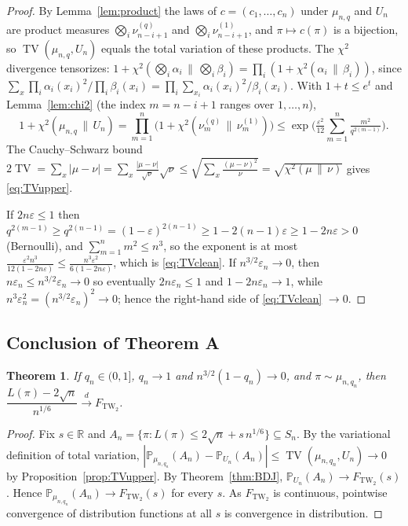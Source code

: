 \documentclass[12pt]{article}
\newtheorem{theorem}{Theorem}
\theoremstyle{definition}
\DeclareMathOperator{\TV}{TV}
\newcommand{\TW}{\mathrm{TW}_2}
\newcommand{\PP}{\mathbb{P}}
\newcommand{\R}{\mathbb{R}}
\newcommand{\eps}{\varepsilon}
\begin{document}
\begin{proof}
By Lemma~\ref{lem:product} the laws of $c=(c_1,\dots,c_n)$ under $\mu_{n,q}$ and $U_n$
are product measures $\bigotimes_i\nu^{(q)}_{n-i+1}$ and $\bigotimes_i\nu^{(1)}_{n-i+1}$,
and $\pi\mapsto c(\pi)$ is a bijection, so $\TV(\mu_{n,q},U_n)$ equals the total
variation of these products. The $\chi^2$ divergence tensorizes:
$1+\chi^2(\bigotimes_i\alpha_i\,\|\,\bigotimes_i\beta_i)=\prod_i(1+\chi^2(\alpha_i\,\|\,\beta_i))$,
since $\sum_x\prod_i\alpha_i(x_i)^2/\prod_i\beta_i(x_i)=\prod_i\sum_{x_i}\alpha_i(x_i)^2/\beta_i(x_i)$.
With $1+t\le e^t$ and Lemma~\ref{lem:chi2} (the index $m=n-i+1$ ranges over
$1,\dots,n$),
\[
1+\chi^2(\mu_{n,q}\,\|\,U_n)=\prod_{m=1}^n\big(1+\chi^2(\nu^{(q)}_m\,\|\,\nu^{(1)}_m)\big)
\le\exp\!\Big(\tfrac{\eps^2}{12}\sum_{m=1}^n\tfrac{m^2}{q^{2(m-1)}}\Big).
\]
The Cauchy--Schwarz bound
$2\TV=\sum_x|\mu-\nu|=\sum_x\frac{|\mu-\nu|}{\sqrt\nu}\sqrt\nu\le\sqrt{\sum_x\frac{(\mu-\nu)^2}{\nu}}
=\sqrt{\chi^2(\mu\,\|\,\nu)}$ gives \eqref{eq:TVupper}.

If $2n\eps\le1$ then $q^{2(m-1)}\ge q^{2(n-1)}=(1-\eps)^{2(n-1)}\ge 1-2(n-1)\eps\ge1-2n\eps>0$
(Bernoulli), and $\sum_{m=1}^n m^2\le n^3$, so the exponent is at most
$\frac{\eps^2 n^3}{12(1-2n\eps)}\le \frac{n^3\eps^2}{6(1-2n\eps)}$, which is
\eqref{eq:TVclean}. If $n^{3/2}\eps_n\to0$, then $n\eps_n\le n^{3/2}\eps_n\to0$ so
eventually $2n\eps_n\le1$ and $1-2n\eps_n\to1$, while $n^3\eps_n^2=(n^{3/2}\eps_n)^2\to0$;
hence the right-hand side of \eqref{eq:TVclean} $\to0$.
\end{proof}

\subsection{Conclusion of Theorem A}
\begin{theorem}\label{thm:A}
If $q_n\in(0,1]$, $q_n\to1$ and $n^{3/2}(1-q_n)\to0$, and $\pi\sim\mu_{n,q_n}$, then
$\dfrac{L(\pi)-2\sqrt n}{n^{1/6}}\xrightarrow{d}F_{\TW}$.
\end{theorem}

\begin{proof}
Fix $s\in\R$ and $A_n=\{\pi:L(\pi)\le 2\sqrt n+s\,n^{1/6}\}\subseteq S_n$. By the
variational definition of total variation,
$|\PP_{\mu_{n,q_n}}(A_n)-\PP_{U_n}(A_n)|\le \TV(\mu_{n,q_n},U_n)\to0$ by
Proposition~\ref{prop:TVupper}. By Theorem~\ref{thm:BDJ}, $\PP_{U_n}(A_n)\to F_{\TW}(s)$.
Hence $\PP_{\mu_{n,q_n}}(A_n)\to F_{\TW}(s)$ for every $s$. As $F_{\TW}$ is continuous,
pointwise convergence of distribution functions at all $s$ is convergence in
distribution.
\end{proof}
\end{document}
